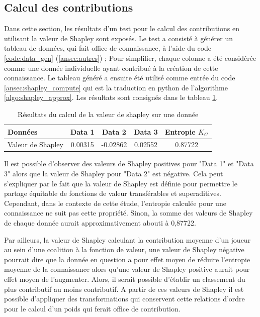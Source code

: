 \subsection{Calcul des contributions} \label{subsec:res_calcul des contributions}

Dans cette section, les résultats d'un test pour le calcul des contributions en utilisant la valeur de Shapley sont exposés. Le test a consisté à générer un tableau de données, qui fait office de connaissance, à l'aide du code \ref{code:data_gen} (\autoref{ansec:autres}) ; Pour simplifier, chaque colonne a été considérée comme une donnée individuelle ayant contribué à la création de cette connaissance. Le tableau généré a ensuite été utilisé comme entrée du code \ref{ansec:shapley_compute} qui est la traduction en python de l'algorithme \ref{algo:shapley_approx}. Les résultats sont consignés dans le tableau \ref{table:result_shapley}.

\begin{table}[h]
\centering
\begin{tabular}{l c c c c}
\toprule
Données & Data 1 & Data 2 & Data 3 & Entropie $K_G$  \\
\midrule
Valeur de Shapley & 0.00315 & -0.02862 & 0.02552 & 0.87722 \\
\bottomrule
\end{tabular}
\caption{Résultats du calcul de la valeur de shapley sur une donnée} \label{table:result_shapley}
\end{table}

Il est possible d'observer des valeurs de Shapley positives pour "Data 1" et "Data 3" alors que la valeur de Shapley pour "Data 2" est négative. Cela peut s'expliquer par le fait que la valeur de Shapley est définie pour permettre le partage équitable de fonctions de valeur transférables et superaditives. Cependant, dans le contexte de cette étude, l'entropie calculée pour une connaissance ne suit pas cette propriété. Sinon, la somme des valeurs de Shapley de chaque donnée aurait approximativement abouti à 0,87722.  

Par ailleurs, la valeur de Shapley calculant la contribution moyenne d'un joueur au sein d'une coalition à la fonction de valeur, une valeur de Shapley négative pourrait dire que la donnée en question a pour effet moyen de réduire l'entropie moyenne de la connaissance alors qu'une valeur de Shapley positive aurait pour effet moyen de l'augmenter. Alors, il serait possible d'établir un classement du plus contributif au moins contributif. A partir de ces valeurs de Shapley il est possible d'appliquer des transformations qui conservent cette relations d'ordre pour le calcul d'un poids qui ferait office de contribution. 

